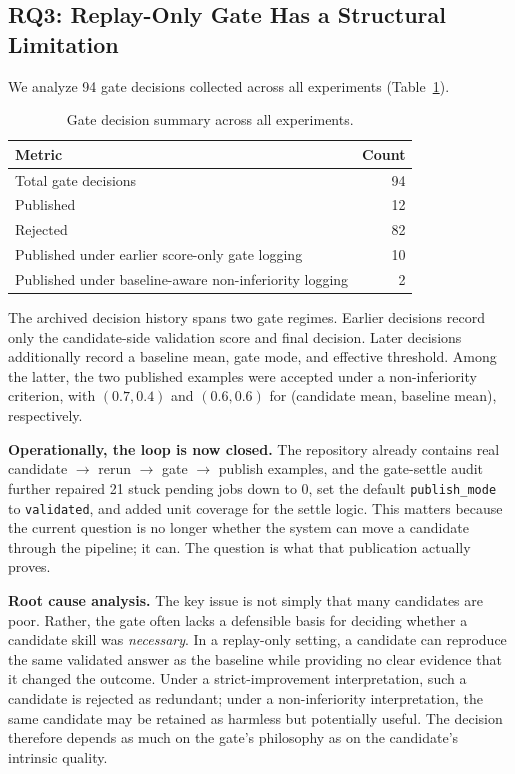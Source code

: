 ﻿\documentclass[preprint,12pt]{elsarticle}
\begin{document}
\subsection{RQ3: Replay-Only Gate Has a Structural Limitation}
\label{sec:results_gate}

We analyze 94 gate decisions collected across all experiments
(Table~\ref{tab:gate_stats}).

\begin{table}[t]
\centering
\caption{Gate decision summary across all experiments.}
\label{tab:gate_stats}
\small
\begin{tabular}{lr}
\toprule
Metric & Count \\
\midrule
Total gate decisions & 94 \\
Published & 12 \\
Rejected & 82 \\
Published under earlier score-only gate logging & 10 \\
Published under baseline-aware non-inferiority logging & 2 \\
\bottomrule
\end{tabular}
\end{table}

The archived decision history spans two gate regimes.  Earlier decisions
record only the candidate-side validation score and final decision.  Later
decisions additionally record a baseline mean, gate mode, and effective
threshold.  Among the latter, the two published examples were accepted
under a non-inferiority criterion, with $(0.7, 0.4)$ and $(0.6, 0.6)$ for
(candidate mean, baseline mean), respectively.

\textbf{Operationally, the loop is now closed.}
The repository already contains real candidate $\rightarrow$ rerun
$\rightarrow$ gate $\rightarrow$ publish examples, and the gate-settle
audit further repaired 21 stuck pending jobs down to 0, set the default
\texttt{publish\_mode} to \texttt{validated}, and added unit coverage for
the settle logic.  This matters because the current question is no longer
whether the system can move a candidate through the pipeline; it can.  The
question is what that publication actually proves.

\textbf{Root cause analysis.}
The key issue is not simply that many candidates are poor.  Rather, the
gate often lacks a defensible basis for deciding whether a candidate skill
was \emph{necessary}.  In a replay-only setting, a candidate can reproduce
the same validated answer as the baseline while providing no clear evidence
that it changed the outcome.  Under a strict-improvement interpretation,
such a candidate is rejected as redundant; under a non-inferiority
interpretation, the same candidate may be retained as harmless but
potentially useful.  The decision therefore depends as much on the gate's
philosophy as on the candidate's intrinsic quality.
\end{document}
